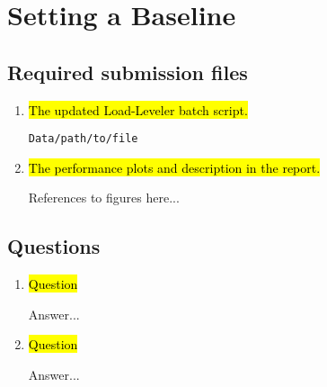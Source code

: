 \section{Setting a Baseline}
\subsection{Required submission files}
\begin{enumerate}
	\item \hl{The updated Load-Leveler batch script.}

		\verb!Data/path/to/file!

	\item \hl{The performance plots and description in the report.}

		References to figures here...

\end{enumerate}

\subsection{Questions}
\begin{enumerate}
	\item \hl{Question}

	Answer...

	\item \hl{Question}

	Answer...

	
\end{enumerate}


